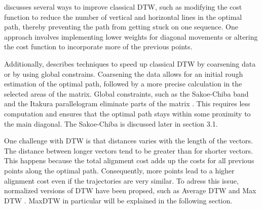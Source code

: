 \textcite{muller2007dynamic} discusses several ways to improve classical DTW, such as modifying the cost function to reduce the number of vertical and horizontal lines in the optimal path, thereby preventing the path from getting stuck on one sequence. One approach involves implementing lower weights for diagonal movements or altering the cost function to incorporate more of the previous points.

Additionally, \textcite{muller2007dynamic} describes techniques to speed up classical DTW by coarsening data or by using global constrains. Coarsening the data allows for an initial rough estimation of the optimal path, followed by a more precise calculation in the selected areas of the matrix. Global constraints, such as the Sakoe-Chiba band and the Itakura parallelogram eliminate parts of the matrix \cite{muller2007dynamic}. This requires less computation and ensures that the optimal path stays within some proximity to the main diagonal. The Sakoe-Chiba is discussed later in section 3.1.

One challenge with DTW is that distances varies with the length of the vectors. The distance between longer vectors tend to be greater than for shorter vectors. This happens because the total alignment cost adds up the costs for all previous points along the optimal path. Consequently, more points lead to a higher alignment cost even if the trajectories are very similar. To adress this issue, normalized versions of DTW have been propsed, such as Average DTW and Max DTW \cite{zhao2018rest}. MaxDTW in particular will be explained in the following section.

